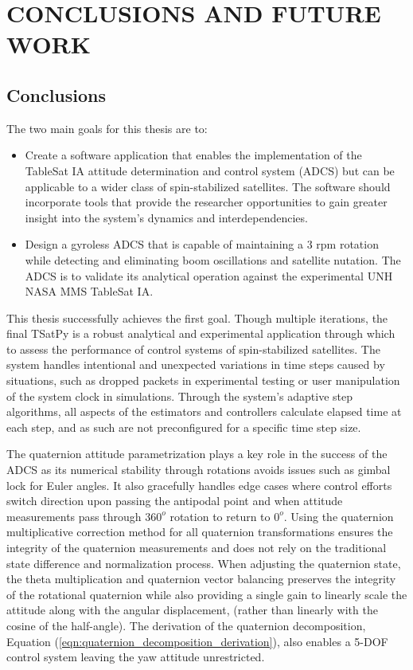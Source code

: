 \chapter{CONCLUSIONS AND FUTURE WORK}
\label{chap:Conclusions}

\section{Conclusions}

The two main goals for this thesis are to:

\begin{itemize}
\item Create a software application that enables the implementation of the TableSat IA attitude determination and control system (ADCS) but can be applicable to a wider class of spin-stabilized satellites.  The software should incorporate tools that provide the researcher opportunities to gain greater insight into the system's dynamics and interdependencies.
\item Design a gyroless ADCS that is capable of maintaining a 3 rpm rotation while detecting and eliminating boom oscillations and satellite nutation.  The ADCS is to validate its analytical operation against the experimental UNH NASA MMS TableSat IA.
\end{itemize}

This thesis successfully achieves the first goal.  Though multiple iterations, the final TSatPy is a robust analytical and experimental application through which to assess the performance of control systems of spin-stabilized satellites.  The system handles intentional and unexpected variations in time steps caused by situations, such as dropped packets in experimental testing or user manipulation of the system clock in simulations.  Through the system's adaptive step algorithms, all aspects of the estimators and controllers calculate elapsed time at each step, and as such are not preconfigured for a specific time step size.

The quaternion attitude parametrization plays a key role in the success of the ADCS as its numerical stability through rotations avoids issues such as gimbal lock for Euler angles.  It also gracefully handles edge cases where control efforts switch direction upon passing the antipodal point and when attitude measurements pass through $360^o$ rotation to return to $0^o$.  Using the quaternion multiplicative correction method for all quaternion transformations ensures the integrity of the quaternion measurements and does not rely on the traditional state difference and normalization process.  When adjusting the quaternion state, the theta multiplication and quaternion vector balancing preserves the integrity of the rotational quaternion while also providing a single gain to linearly scale the attitude along with the angular displacement, (rather than linearly with the cosine of the half-angle).  The derivation of the quaternion decomposition, Equation (\ref{eqn:quaternion_decomposition_derivation}), also enables a 5-DOF control system leaving the yaw attitude unrestricted.

